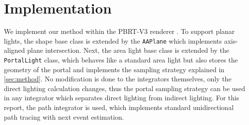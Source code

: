 \section{Implementation}
\label{sec:implementation}

We implement our method within the PBRT-V3 renderer \cite{pharrPhysicallyBasedRendering2016}. To support planar lights, the shape base class is extended by the \texttt{AAPlane} which implements axis-aligned plane intersection. Next, the area light base class is extended by the \texttt{PortalLight} class, which behaves like a standard area light but also stores the geometry of the portal and implements the sampling strategy explained in \autoref{sec:method}. No modification is done to the integrators themselves, only the direct lighting calculation changes, thus the portal sampling strategy can be used in any integrator which separates direct lighting from indirect lighting. For this report, the path integrator is used, which implements standard unidirectional path tracing with next event estimation.
